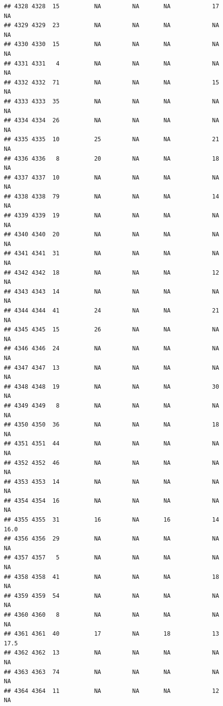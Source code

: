 \documentclass[man]{apa6}
\begin{document}
\begin{verbatim}
## 4328 4328  15          NA         NA       NA            17       NA
## 4329 4329  23          NA         NA       NA            NA       NA
## 4330 4330  15          NA         NA       NA            NA       NA
## 4331 4331   4          NA         NA       NA            NA       NA
## 4332 4332  71          NA         NA       NA            15       NA
## 4333 4333  35          NA         NA       NA            NA       NA
## 4334 4334  26          NA         NA       NA            NA       NA
## 4335 4335  10          25         NA       NA            21       NA
## 4336 4336   8          20         NA       NA            18       NA
## 4337 4337  10          NA         NA       NA            NA       NA
## 4338 4338  79          NA         NA       NA            14       NA
## 4339 4339  19          NA         NA       NA            NA       NA
## 4340 4340  20          NA         NA       NA            NA       NA
## 4341 4341  31          NA         NA       NA            NA       NA
## 4342 4342  18          NA         NA       NA            12       NA
## 4343 4343  14          NA         NA       NA            NA       NA
## 4344 4344  41          24         NA       NA            21       NA
## 4345 4345  15          26         NA       NA            NA       NA
## 4346 4346  24          NA         NA       NA            NA       NA
## 4347 4347  13          NA         NA       NA            NA       NA
## 4348 4348  19          NA         NA       NA            30       NA
## 4349 4349   8          NA         NA       NA            NA       NA
## 4350 4350  36          NA         NA       NA            18       NA
## 4351 4351  44          NA         NA       NA            NA       NA
## 4352 4352  46          NA         NA       NA            NA       NA
## 4353 4353  14          NA         NA       NA            NA       NA
## 4354 4354  16          NA         NA       NA            NA       NA
## 4355 4355  31          16         NA       16            14     16.0
## 4356 4356  29          NA         NA       NA            NA       NA
## 4357 4357   5          NA         NA       NA            NA       NA
## 4358 4358  41          NA         NA       NA            18       NA
## 4359 4359  54          NA         NA       NA            NA       NA
## 4360 4360   8          NA         NA       NA            NA       NA
## 4361 4361  40          17         NA       18            13     17.5
## 4362 4362  13          NA         NA       NA            NA       NA
## 4363 4363  74          NA         NA       NA            NA       NA
## 4364 4364  11          NA         NA       NA            12       NA

\end{verbatim}
\end{document}
